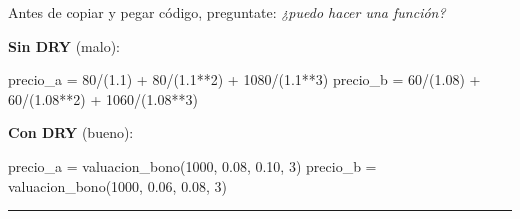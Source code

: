 \documentclass[
  spanish,
  letterpaper,
  DIV=11,
  numbers=noendperiod]{scrreprt}
\newenvironment{Shaded}{\begin{snugshade}}{\end{snugshade}}
\newcommand{\DecValTok}[1]{\textcolor[rgb]{0.68,0.00,0.00}{#1}}
\newcommand{\FloatTok}[1]{\textcolor[rgb]{0.68,0.00,0.00}{#1}}
\newcommand{\NormalTok}[1]{\textcolor[rgb]{0.00,0.23,0.31}{#1}}
\newcommand{\OperatorTok}[1]{\textcolor[rgb]{0.37,0.37,0.37}{#1}}
\begin{document}
\begin{tcolorbox}[enhanced jigsaw, bottomrule=.15mm, colback=white, opacitybacktitle=0.6, arc=.35mm, toprule=.15mm, opacityback=0, breakable, titlerule=0mm, left=2mm, coltitle=black, colbacktitle=quarto-callout-tip-color!10!white, colframe=quarto-callout-tip-color-frame, leftrule=.75mm, toptitle=1mm, bottomtitle=1mm, title=\textcolor{quarto-callout-tip-color}{\faLightbulb}\hspace{0.5em}{DRY en la Práctica}, rightrule=.15mm]

Antes de copiar y pegar código, preguntate: \emph{¿puedo hacer una
función?}

\textbf{Sin DRY} (malo):

\begin{Shaded}
\begin{Highlighting}[]
\NormalTok{precio\_a }\OperatorTok{=} \DecValTok{80}\OperatorTok{/}\NormalTok{(}\FloatTok{1.1}\NormalTok{) }\OperatorTok{+} \DecValTok{80}\OperatorTok{/}\NormalTok{(}\FloatTok{1.1}\OperatorTok{**}\DecValTok{2}\NormalTok{) }\OperatorTok{+} \DecValTok{1080}\OperatorTok{/}\NormalTok{(}\FloatTok{1.1}\OperatorTok{**}\DecValTok{3}\NormalTok{)}
\NormalTok{precio\_b }\OperatorTok{=} \DecValTok{60}\OperatorTok{/}\NormalTok{(}\FloatTok{1.08}\NormalTok{) }\OperatorTok{+} \DecValTok{60}\OperatorTok{/}\NormalTok{(}\FloatTok{1.08}\OperatorTok{**}\DecValTok{2}\NormalTok{) }\OperatorTok{+} \DecValTok{1060}\OperatorTok{/}\NormalTok{(}\FloatTok{1.08}\OperatorTok{**}\DecValTok{3}\NormalTok{)}
\end{Highlighting}
\end{Shaded}

\textbf{Con DRY} (bueno):

\begin{Shaded}
\begin{Highlighting}[]
\NormalTok{precio\_a }\OperatorTok{=}\NormalTok{ valuacion\_bono(}\DecValTok{1000}\NormalTok{, }\FloatTok{0.08}\NormalTok{, }\FloatTok{0.10}\NormalTok{, }\DecValTok{3}\NormalTok{)}
\NormalTok{precio\_b }\OperatorTok{=}\NormalTok{ valuacion\_bono(}\DecValTok{1000}\NormalTok{, }\FloatTok{0.06}\NormalTok{, }\FloatTok{0.08}\NormalTok{, }\DecValTok{3}\NormalTok{)}
\end{Highlighting}
\end{Shaded}

\end{tcolorbox}

\begin{center}\rule{0.5\linewidth}{0.5pt}\end{center}
\end{document}
